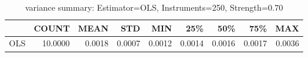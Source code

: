 \begin{table}[ht]
\centering
\caption{variance summary: Estimator=OLS, Instruments=250, Strength=0.70}
\begin{tabular}{lrrrrrrrr}
\toprule
 & COUNT & MEAN & STD & MIN & 25\% & 50\% & 75\% & MAX \\
\midrule
OLS & 10.0000 & 0.0018 & 0.0007 & 0.0012 & 0.0014 & 0.0016 & 0.0017 & 0.0036 \\
\bottomrule
\end{tabular}
\end{table}
